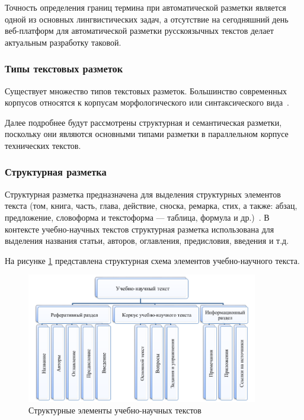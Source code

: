 Точность определения границ термина при автоматической разметки является одной из основных лингвистических задач, а отсутствие на сегодняшний день веб-платформ для автоматической разметки русскоязычных текстов делает актуальным разработку таковой.


\subsubsection*{Типы текстовых разметок}

Существует множество типов текстовых разметок.
Большинство современных корпусов относятся к корпусам морфологического или синтаксического вида~\cite[с. 56]{cl2020}.

Далее подробнее будут рассмотрены структурная и семантическая разметки, поскольку они являются основными типами разметки в параллельном корпусе технических текстов.

\newpage

\subsubsection*{Структурная разметка}

Структурная разметка предназначена для выделения структурных элементов текста (том, книга, часть, глава, действие, сноска, ремарка, стих, а также: абзац, предложение, словоформа и текстоформа --- таблица, формула и др.)~\cite{lesnikov2019}.
В контексте учебно-научных текстов структурная разметка использована для выделения названия статьи, авторов, оглавления, предисловия, введения и т.д.

На рисунке \ref{fig:ts} представлена структурная схема элементов учебно-научного текста. 

\begin{figure}[H]
	\centering
	\includegraphics[width=0.9\textwidth]{img/tagging-struct.png}
	\caption{Структурные элементы учебно-научных текстов~\cite{butenko2021}}
	\label{fig:ts}
\end{figure}

